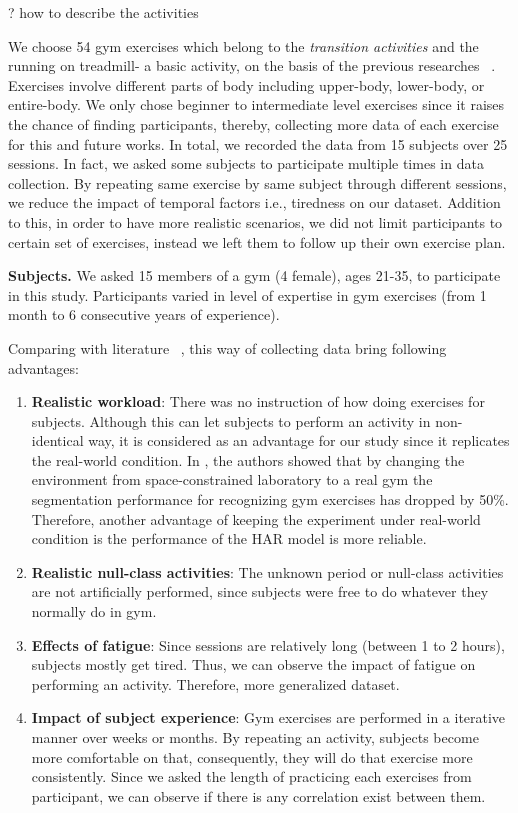 \documentclass[journal,article,submit,moreauthors,pdftex]{Definitions/mdpi}
\begin{document}
? how to describe the activities

We choose 54 gym exercises which belong to the \textit{transition activities} and the running on treadmill- a basic activity, on the basis of the previous researches ~\cite{}. Exercises involve different parts of body including upper-body, lower-body, or entire-body. We only chose beginner to intermediate level exercises since it raises the chance of finding participants, thereby, collecting more data of each exercise for this and future works. 
In total, we recorded the data from 15 subjects over 25 sessions. In fact, we asked some subjects to participate multiple times in data collection. By repeating same exercise by same subject through different sessions, we reduce the impact of temporal factors i.e., tiredness on our dataset.
Addition to this, in order to have more realistic scenarios, we did not limit participants to certain set of exercises, instead we left them to follow up their own exercise plan.

\noindent \textbf{Subjects.} We asked 15 members of a gym (4 female), ages 21-35, to participate in this study. Participants varied in level of expertise in gym exercises (from 1 month to 6 consecutive years of experience). 

Comparing with literature ~\cite{morris2014recofit, soro2019recognition, s140610146, anguita2013public}, this way of collecting data bring following advantages:

\begin{enumerate}
	
	\item \textbf{Realistic workload}: There was no instruction of how doing exercises for subjects. Although this can let subjects to perform an activity in non-identical way, it is considered as an advantage for our study since it replicates the real-world condition. In \cite{morris2014recofit}, the authors showed that by changing the environment from space-constrained laboratory to a real gym the segmentation performance for recognizing gym exercises has dropped by 50\%. Therefore, another advantage of keeping the experiment under real-world condition is the performance of the HAR model is more reliable.	
	\item \textbf{Realistic null-class activities}:	The unknown period or null-class activities are not artificially performed, since subjects were free to do whatever they normally do in gym.	
	\item \textbf{Effects of fatigue}: Since sessions are relatively long (between 1 to 2 hours), subjects mostly get tired. Thus, we can observe the impact of fatigue on performing an activity. Therefore, more generalized dataset.
	
	\item \textbf{Impact of subject experience}: Gym exercises are performed in a iterative manner over weeks or months. By repeating an activity, subjects become more comfortable on that, consequently, they will do that exercise more consistently. Since we asked the length of practicing each exercises from participant, we can observe if there is any correlation exist between them.
\end{enumerate}
\end{document}
